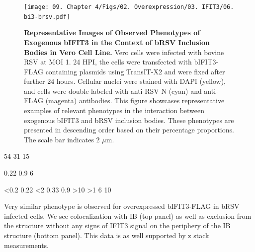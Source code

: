 \begin{figure}
    \centering
    \texttt{[image: 09. Chapter 4/Figs/02. Overexpression/03. IFIT3/06. bi3-brsv.pdf]}
    \caption[Representative Images of Observed Phenotypes of Exogenous bIFIT3 in the Context of bRSV Inclusion Bodies in Vero Cell Line.]{\textbf{Representative Images of Observed Phenotypes of Exogenous bIFIT3 in the Context of bRSV Inclusion Bodies in Vero Cell Line.} Vero cells were infected with bovine RSV at MOI 1. 24 HPI, the cells were transfected with bIFIT3-FLAG containing plasmids using TransIT-X2 and were fixed after further 24 hours. Cellular nuclei were stained with DAPI (yellow), and cells were double-labeled with anti-RSV N (cyan) and anti-FLAG (magenta) antibodies. This figure showcases representative examples of relevant phenotypes in the interaction between exogenous bIFIT3 and bRSV inclusion bodies. These phenotypes are presented in descending order based on their percentage proportions. The scale bar indicates 2 \(\mu \mbox{m}\).}
    \label{fig:Representative Images of Observed Phenotypes of Exogenous bIFIT3 in the Context of bRSV Inclusion Bodies in VERO Cell Line}
\end{figure}

54 31 15

0.22 0.9 6

<0.2 0.22 <2
0.33 0.9 >10
>1 6 10

Very similar phenotype is observed for overexpressed bIFIT3-FLAG in bRSV infected cells. We see colocalization with IB (top panel) as well as exclusion from the structure without any signs of IFIT3 signal on the periphery of the IB structure (bottom panel). This data is as well supported by z stack measurements.

